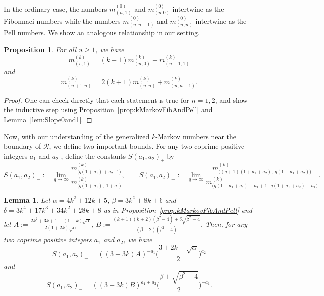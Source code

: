 \documentclass{article}
\newtheorem{lemma}[theorem]{Lemma}
\newtheorem{prop}[theorem]{Proposition}
\theoremstyle{remark}
\newcommand{\mk}{m^{(k)}}
\begin{document}
In the ordinary case, the numbers $m^{(0)}_{(n,1)}$ and $m^{(0)}_{(n,0)}$ intertwine as the Fibonnaci numbers while the numbers $m^{(0)}_{(n,n-1)}$ and $m^{(0)}_{(n,n)}$ intertwine as the Pell numbers. We show an analogous relationship in our setting. 

\begin{prop}\label{prop:Intertwine}
For all $n \geq 1$, we have  \[
\mk_{(n,1)} = (k+1) \mk_{(n,0)} + \mk_{(n-1,1)} 
\]
and
\[
\mk_{(n+1,n)} = 2(k+1)\mk_{(n,n)} + \mk_{(n,n-1)}.
\]

\end{prop}

\begin{proof}
One can check directly that each statement is true for $n = 1,2$, and show the inductive step using Proposition~\ref{prop:kMarkovFibAndPell} and Lemma~\ref{lem:Slope0and1}.
\end{proof}

Now, with our understanding of the generalized $k$-Markov numbers near the boundary of $\mathcal{R}$, we define two important bounds. 
For any two coprime positive integers  $ a_1 $  and  $ a_2 $ , define the constants  $S(a_1,a_2)_\pm$ by
\begin{equation}\label{eq:a_pm_def}
S(a_1,a_2)_- := \lim_{q \to \infty} \frac{m^{(k)}_{\bigl(q(1+a_1)+a_2,\; 1\bigr)}}{m^{(k)}_{\bigl(q(1+a_1),\; 1+a_1\bigr)}},
\qquad
S(a_1,a_2)_+ := \lim_{q \to \infty} \frac{m^{(k)}_{\bigl((q+1)(1+a_1+a_2),\; q(1+a_1+a_2)\bigr)}}{m^{(k)}_{\bigl(q(1+a_1+a_2)+a_1+1,\; q(1+a_1+a_2)+a_1\bigr)}}.
\end{equation}

\begin{lemma}
Let $\alpha = 4k^2 + 12k + 5$, $\beta= 3k^2 + 8k + 6$ and $\delta= 3k^4 + 17k^3 + 34 k^2 + 28k + 8$ as in Proposition~\ref{prop:kMarkovFibAndPell} and let $A:= \frac{2k^2 + 3k + 1 + (1+k)\sqrt{\alpha}}{2(1+2k)\sqrt{\alpha}}$, $B:=\frac{(k+1)(k+2)(\beta^2-4)+\delta\sqrt{\beta^2-4}}{(\beta-2)(\beta^2-4)}$.
Then, for any two coprime positive integers $a_1$ and $a_2$, we have  
\begin{equation}
S(a_1,a_2)_-= ((3+3k)A)^{-a_1}\bigg(\frac{3+2k+\sqrt{\alpha}}{2}\bigg)^{a_2}
\end{equation}
and
\begin{equation}\label{eq:s+}
S(a_1,a_2)_+=((3+3k)B)^{a_1 + a_2} \bigg(\frac{\beta + \sqrt{\beta^2-4}}{2}\bigg)^{-a_1}. 
\end{equation}

\end{lemma}
\end{document}
